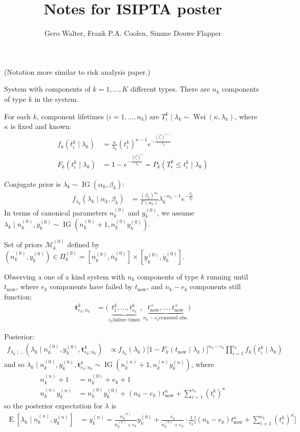 \documentclass[12pt,a4paper,fleqn]{narms}
\title{Notes for ISIPTA poster}
\author{Gero Walter, Frank P.A. Coolen, Simme Douwe Flapper}
\newcommand{\mbf}[1]{\mathbf{#1}}
\newcommand{\uz}{^{(0)}} %
\newcommand{\un}{^{(n)}} %
\newcommand{\ul}[1]{\underline{#1}}
\newcommand{\ol}[1]{\overline{#1}}
\newcommand{\E}{\operatorname{E}}
\newcommand{\wei}{\operatorname{Wei}} %
\newcommand{\ig}{\operatorname{IG}}   %
\def\ykz{y\uz_k}
\def\ykn{y\un_k}
\def\ykzl{\ul{y}\uz_k}
\def\ykzu{\ol{y}\uz_k}
\def\nkz{n\uz_k}
\def\nkn{n\un_k}
\def\nkzl{\ul{n}\uz_k}
\def\nkzu{\ol{n}\uz_k}
\def\MkZ{\mathcal{M}\uz_k}
\def\PkZ{\Pi\uz_k}
\def\tnow{t_\text{now}}
\def\tpnow{t^+_\text{now}}
\begin{document}
\maketitle

(Notation more similar to risk analysis paper.)

System with components of $k=1,\ldots,K$ different types.
There are $n_k$ components of type $k$ in the system.

For each $k$, component lifetimes ($i=1,\ldots,n_k$) are $T_i^k \mid \lambda_k \sim \wei(\kappa,\lambda_k)$,
where $\kappa$ is fixed and known:
\begin{align}
f_k(t_i^k \mid \lambda_k) &= \frac{\kappa}{\lambda_k} (t_i^k)^{\kappa-1} e^{-\frac{(t_i^k)^{\kappa-1}}{\lambda_k}} \\
F_k(t_i^k \mid \lambda_k) &= 1 - e^{-\frac{(t_i^k)^\kappa}{\lambda_k}} = P_k(T_i^k \leq t_i^k \mid \lambda_k)
\end{align}

Conjugate prior is $\lambda_k \sim \ig(\alpha_k,\beta_k)$:
\begin{align}
f_{\lambda_k}(\lambda_k\mid \alpha_k,\beta_k) &= \frac{(\beta_k)^{\alpha_k}}{\Gamma(\alpha_k)} \lambda_k^{-\alpha_k -1} e^{-\frac{\beta_k}{\lambda_k}}
\end{align}
In terms of canonical parameters $\nkz$ and $\ykz$, we assume $\lambda_k \mid \nkz,\ykz \sim \ig(\nkz + 1, \nkz\ykz)$.

Set of priors $\MkZ$ defined by $(\nkz,\ykz) \in \PkZ = [\nkzl,\nkzu] \times [\ykzl,\ykzu]$.

Observing a one of a kind system with $n_k$ components of type $k$ running until $\tnow$,
where $e_k$ components have failed by $\tnow$, and $n_k - e_k$ components still function:
\begin{align}
\mbf{t}^k_{e_k;n_k} &= \big( \underbrace{t^k_1, \ldots, t^k_{e_k}}_{e_k \text{failure times}},
                             \underbrace{\tpnow, \ldots, \tpnow}_{n_k-e_k \text{censored obs.}} \big)
\end{align}

Posterior:
\begin{align}
f_{\lambda_k\mid\ldots}(\lambda_k\mid\nkz,\ykz,\mbf{t}^k_{e_k;n_k})
 &\propto f_{\lambda_k}(\lambda_k)
          \big[ 1- F_k(\tnow\mid\lambda_k) \big]^{n_k-e_k}
          \prod_{i=1}^{e_k} f_k(t_i^k \mid \lambda_k) 
\end{align}
and so $\lambda_k\mid\nkz,\ykz,\mbf{t}^k_{e_k;n_k} \sim \ig(\nkn + 1, \nkn\ykn)$, where
\begin{align}
\nkn + 1 &= \nkz + e_k + 1 \\
\nkn\ykn &= \nkz\ykz + (n_k-e_k) \tnow^\kappa + \sum_{i=1}^{e_k} (t_i^k)^\kappa
\end{align}
so the posterior expectation for $\lambda$ is
\begin{align}
\E[\lambda_k\mid\nkn,\ykn] &= \ykn
                            = \frac{\nkz}{\nkz + e_k} \ykz +
                              \frac{e_k}{\nkz + e_k} \cdot \frac{1}{e_k}\Big[(n_k-e_k) \tnow^\kappa + \sum_{i=1}^{e_k} (t_i^k)^\kappa \Big]
\end{align}
\end{document}
